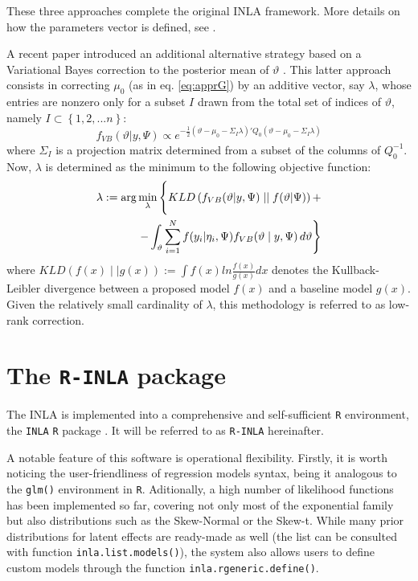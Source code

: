 \documentclass[openany]{book}
\begin{document}
These three approaches complete the original INLA framework. More details on how the parameters vector is defined, see \cite{INLA2017}. 

A recent paper introduced an additional alternative strategy based on a Variational Bayes correction to the posterior mean of $\vartheta$ \cite{VB}. This latter approach consists in correcting $\mu_0$ (as in eq. \ref{eq:apprG}) by an additive vector, say $\lambda$, whose entries are nonzero only for a subset $I$ drawn from the total set of indices of $\vartheta$, namely $I \subset \left\{ 1, 2, ... n\right \}$:
$$
f_{VB}(\vartheta | y, \Psi) \propto e^{\displaystyle{
 - \frac{1}{2}(\vartheta - \mu_0 - \Sigma_I \lambda)'Q_0(\vartheta - \mu_0 - \Sigma_I \lambda)
}}
$$
where $\Sigma_I$ is a projection matrix determined from a subset of the columns of $Q_0^{-1}$. Now, $\lambda$ is determined as the minimum to the following objective function:
\begin{equation}
\begin{aligned}
\lambda := \arg \min_{\lambda} \Bigg{\lbrace}
KLD\left( f_{VB}(\vartheta | y, \Psi) \mid \mid f(\vartheta | \Psi)\right) + \\
-\int_{\vartheta}  \sum_{i=1}^{N} f(y_i | \eta_i, \Psi) f_{VB}(\vartheta \mid y, \Psi)\, d \vartheta \Bigg{\rbrace}
\label{VBINLA}
\end{aligned}
\end{equation}
where $KLD(f(x) \mid \mid g(x)) := \int f(x) ln \displaystyle{\frac{f(x)}{g(x)}}  dx$ denotes the Kullback-Leibler divergence between a proposed model $f(x)$ and a baseline model $g(x)$. Given the relatively small cardinality of $\lambda$, this methodology is referred to as low-rank correction. 

\section{The \texttt{R-INLA} package} \label{section:r_inla}

The INLA is implemented into a comprehensive and self-sufficient \texttt{R} environment, the \texttt{INLA} \texttt{R} package \citep{INLAbook, Wang}. It will be referred to as \texttt{R-INLA} hereinafter. 

A notable feature of this software is operational flexibility. Firstly, it is worth noticing the user-friendliness of regression models syntax, being it analogous to the \texttt{glm()} environment in \texttt{R}. Aditionally, a high number of likelihood functions has been implemented so far, covering not only most of the exponential family but also distributions such as the Skew-Normal \citep{SN} or the Skew-t. While many prior distributions for latent effects are ready-made as well (the list can be consulted with function \texttt{inla.list.models()}), the system also allows users to define custom models through the function \texttt{inla.rgeneric.define()}. 
\end{document}
